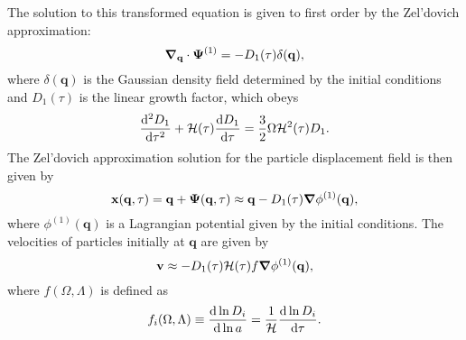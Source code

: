 The solution to this transformed equation is given to first order by the Zel'dovich approximation:
\begin{equation} \label{eq:particle_displacement--zeldovich_approximation}
	{\boldsymbol{\nabla}}_{\mathbf{q}} \cdot \boldsymbol{\Psi}^{(1)} = -D_{1}(\tau) \delta(\mathbf{q}),
\end{equation}
where $\delta(\mathbf{q})$ is the Gaussian density field determined by the initial conditions and $D_{1}(\tau)$ is the linear growth factor, which obeys
\begin{equation}
	\frac{{\rm {d}}^{2} D_{1}}{{\rm {d}} \tau^{2}} + \mathcal{H}(\tau) \frac{{\rm {d}} D_{1}}{{\rm {d}} \tau} = \frac{3}{2} \Omega \mathcal{H}^{2}(\tau) D_{1}.
\end{equation}
The Zel'dovich approximation solution for the particle displacement field is then given by
\begin{equation} \label{eq:particle_displacement--za_displacement}
	\mathbf{x}(\mathbf{q}, \tau) = \mathbf{q} + \boldsymbol{\Psi}(\mathbf{q}, \tau) \approx \mathbf{q} - D_{1}(\tau) {\boldsymbol{\nabla}} \phi^{(1)}(\mathbf{q}),
\end{equation}
where $\phi^{(1)}(\mathbf{q})$ is a Lagrangian potential given by the initial conditions.  The velocities of particles initially at $\mathbf{q}$ are given by
\begin{equation} \label{eq:particle_displacement--za_velocity}
	\mathbf{v} \approx -D_{1}(\tau) \mathcal{H}(\tau) f {\boldsymbol{\nabla}} \phi^{(1)}(\mathbf{q}),
\end{equation}
where $f(\Omega, \Lambda)$ is defined as
\begin{equation}
	f_{i}(\Omega, \Lambda) \equiv \frac{{\rm {d}} \ln D_{i}}{{\rm {d}} \ln a} = \frac{1}{\mathcal{H}} \frac{{\rm {d}} \ln D_{i}}{{\rm {d}} \tau}.
\end{equation}

